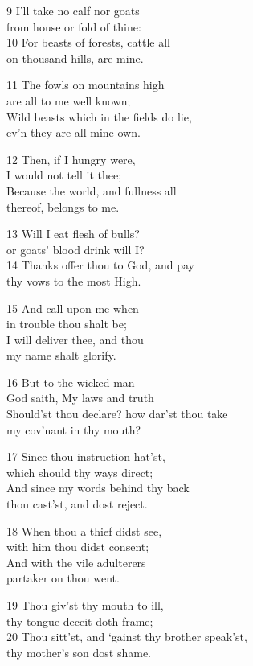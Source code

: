 9 I’ll take no calf nor goats\\
from house or fold of thine:\\
10 For beasts of forests, cattle all\\
on thousand hills, are mine.

11 The fowls on mountains high\\
are all to me well known;\\
Wild beasts which in the fields do lie,\\
ev’n they are all mine own.

12 Then, if I hungry were,\\
I would not tell it thee;\\
Because the world, and fullness all\\
thereof, belongs to me.

13 Will I eat flesh of bulls?\\
or goats’ blood drink will I?\\
14 Thanks offer thou to God, and pay\\
thy vows to the most High.

15 And call upon me when\\
in trouble thou shalt be;\\
I will deliver thee, and thou\\
my name shalt glorify.

16 But to the wicked man\\
God saith, My laws and truth\\
Should’st thou declare? how dar’st thou take\\
my cov’nant in thy mouth?

17 Since thou instruction hat’st,\\
which should thy ways direct;\\
And since my words behind thy back\\
thou cast’st, and dost reject.

18 When thou a thief didst see,\\
with him thou didst consent;\\
And with the vile adulterers\\
partaker on thou went.

19 Thou giv’st thy mouth to ill,\\
thy tongue deceit doth frame;\\
20 Thou sitt’st, and ‘gainst thy brother speak’st,\\
thy mother’s son dost shame.

